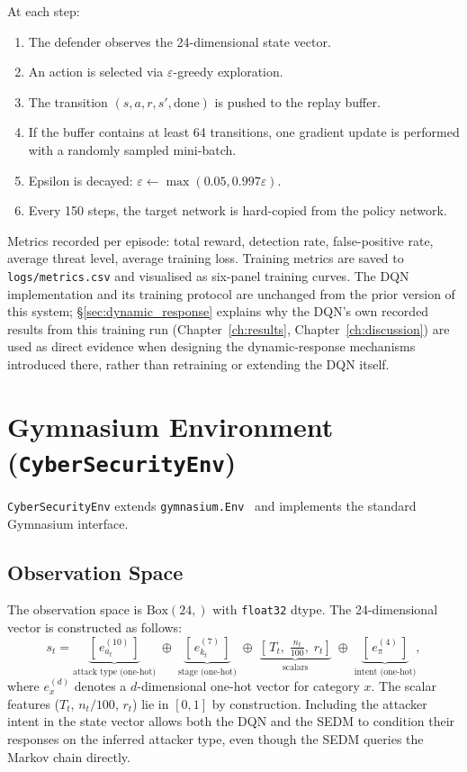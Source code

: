 At each step:
%
\begin{enumerate}
  \item The defender observes the 24-dimensional state vector.
  \item An action is selected via $\varepsilon$-greedy exploration.
  \item The transition $(s, a, r, s', \text{done})$ is pushed to the replay buffer.
  \item If the buffer contains at least 64 transitions, one gradient update
        is performed with a randomly sampled mini-batch.
  \item Epsilon is decayed: $\varepsilon \leftarrow \max(0.05, 0.997\varepsilon)$.
  \item Every 150 steps, the target network is hard-copied from the policy network.
\end{enumerate}

Metrics recorded per episode: total reward, detection rate, false-positive
rate, average threat level, average training loss.
Training metrics are saved to \texttt{logs/metrics.csv} and visualised as
six-panel training curves. The DQN implementation and its training protocol
are unchanged from the prior version of this system; \S\ref{sec:dynamic_response}
explains why the DQN's own recorded results from this training run
(Chapter~\ref{ch:results}, Chapter~\ref{ch:discussion}) are used as direct
evidence when designing the dynamic-response mechanisms introduced there,
rather than retraining or extending the DQN itself.

\section{Gymnasium Environment (\texttt{CyberSecurityEnv})}
\label{sec:env}

\texttt{CyberSecurityEnv} extends \texttt{gymnasium.Env}~\citep{towers2024gymnasium}
and implements the standard Gymnasium interface.

\subsection{Observation Space}

The observation space is $\text{Box}(24,)$ with \texttt{float32} dtype.
The 24-dimensional vector is constructed as follows:
%
\begin{equation}
  s_t = \underbrace{[\,e_{a_t}^{(10)}\,]}_{\text{attack type (one-hot)}}
       \;\oplus\;
       \underbrace{[\,e_{k_t}^{(7)}\,]}_{\text{stage (one-hot)}}
       \;\oplus\;
       \underbrace{\left[\,T_t,\;\tfrac{n_t}{100},\;r_t\right]}_{\text{scalars}}
       \;\oplus\;
       \underbrace{[\,e_{\pi}^{(4)}\,]}_{\text{intent (one-hot)}},
  \label{eq:state}
\end{equation}
%
where $e_x^{(d)}$ denotes a $d$-dimensional one-hot vector for category $x$.
The scalar features ($T_t$, $n_t/100$, $r_t$) lie in $[0, 1]$ by
construction.
Including the attacker intent in the state vector allows both the DQN and the
SEDM to condition their responses on the inferred attacker type, even though
the SEDM queries the Markov chain directly.

